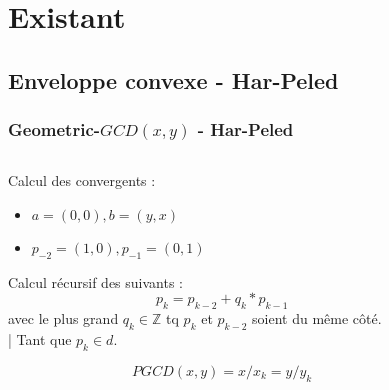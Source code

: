 \documentclass{beamer}
\begin{document}
\section{Existant}

\subsection{Enveloppe convexe - Har-Peled}
\begin{frame}
\frametitle{Geometric-$GCD(x, y)$ - Har-Peled}

\begin{columns}[t]
  \begin{column}{6cm}
    \begin{block}{}
      Calcul des convergents :
      \begin{itemize}
        \item $a = (0,0), b = (y, x)$
        \item $p_{-2} = (1,0), p_{-1} = (0,1)$
      \end{itemize}

      Calcul récursif des suivants :
      \vspace{-0.2cm} 
      \alert{$$ p_{k} = p_{k-2} + q_{k}*p_{k-1}$$}
      avec le plus grand $q_{k} \in \mathbb{Z}$ tq $p_{k}$ et $p_{k-2}$ soient du même côté.\\
      \vspace{0.2cm}
      | Tant que $ p_{k} \in d$.
    \end{block}
    \begin{alertblock}{}
      \vspace{-0.2cm} 
      $$ PGCD(x, y) = x/ x_{k} = y/ y_{k}$$
      \vspace{-0.2cm} 
    \end{alertblock}
  \end{column}

  \begin{column}{4cm}
    

\end{column}
\end{columns}
\end{frame}
\end{document}
